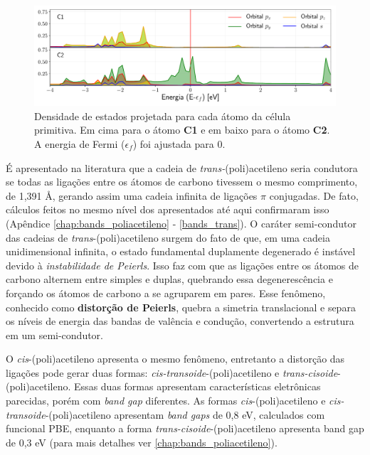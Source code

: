 	
	\begin{figure}[!ht]
		\centering
		\includegraphics[width=1.\linewidth]{capitulos/fig/results1/pdos_byatom0}
		\caption{Densidade de estados projetada para cada átomo da célula primitiva. Em cima para o átomo \textbf{C1} e em baixo para o átomo \textbf{C2}. A energia de Fermi ($\epsilon_f$) foi ajustada para 0.}
		\label{pdos_byatom}
	\end{figure}


	É apresentado na literatura que a cadeia de \textit{trans-}(poli)acetileno seria condutora se todas as ligações entre os átomos de carbono tivessem o mesmo comprimento, de 1,391 \AA{}, gerando assim uma cadeia infinita de ligações $\pi$ conjugadas. \cite{suhai1983bond, whangbo1979conjugated} De fato, cálculos feitos no mesmo nível dos apresentados até aqui confirmaram isso (Apêndice \ref{chap:bands_poliacetileno} - \autoref{bands_trans}). O caráter semi-condutor das cadeias de \textit{trans}-(poli)acetileno surgem do fato de que, em uma cadeia unidimensional infinita, o estado fundamental duplamente degenerado é instável devido à \textit{instabilidade de Peierls}\cite{peierls1996quantum}. Isso faz com que as ligações entre os átomos de carbono alternem entre simples e duplas, quebrando essa degenerescência e forçando os átomos de carbono a se agruparem em pares. Esse fenômeno, conhecido como \textbf{distorção de Peierls}, quebra a simetria translacional e separa os níveis de energia das bandas de valência e condução, convertendo a estrutura em um semi-condutor. \cite{peierls1996quantum}
	
	O \textit{cis}-(poli)acetileno apresenta o mesmo fenômeno, entretanto a distorção das ligações pode gerar duas formas: \textit{cis-transoide}-(poli)acetileno e \textit{trans-cisoide}-(poli)acetileno. Essas duas formas apresentam características eletrônicas parecidas, porém com \textit{band gap} diferentes. As formas \textit{cis}-(poli)acetileno e \textit{cis-transoide}-(poli)acetileno apresentam \textit{band gaps} de 0,8 eV, calculados com funcional PBE, enquanto a forma \textit{trans-cisoide}-(poli)acetileno apresenta band gap de 0,3 eV (para mais detalhes ver \autoref{chap:bands_poliacetileno}).
	
